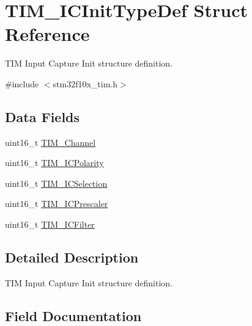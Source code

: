 \hypertarget{struct_t_i_m___i_c_init_type_def}{}\section{T\+I\+M\+\_\+\+I\+C\+Init\+Type\+Def Struct Reference}
\label{struct_t_i_m___i_c_init_type_def}


T\+IM Input Capture Init structure definition.  




{\ttfamily \#include $<$stm32f10x\+\_\+tim.\+h$>$}

\subsection*{Data Fields}
\begin{DoxyCompactItemize}
\item 
uint16\+\_\+t \mbox{\hyperlink{struct_t_i_m___i_c_init_type_def_ac736e711f51054bef8b486b8521ef611}{T\+I\+M\+\_\+\+Channel}}
\item 
uint16\+\_\+t \mbox{\hyperlink{struct_t_i_m___i_c_init_type_def_a71dc0cc2f4eb59451ea323719b0741bb}{T\+I\+M\+\_\+\+I\+C\+Polarity}}
\item 
uint16\+\_\+t \mbox{\hyperlink{struct_t_i_m___i_c_init_type_def_a052908740c8c618054ef82b3ec89e9b3}{T\+I\+M\+\_\+\+I\+C\+Selection}}
\item 
uint16\+\_\+t \mbox{\hyperlink{struct_t_i_m___i_c_init_type_def_abdff50beb0809a640ccf2cebde439a00}{T\+I\+M\+\_\+\+I\+C\+Prescaler}}
\item 
uint16\+\_\+t \mbox{\hyperlink{struct_t_i_m___i_c_init_type_def_a751574b5d1f66bea6c3405d2975e420a}{T\+I\+M\+\_\+\+I\+C\+Filter}}
\end{DoxyCompactItemize}


\subsection{Detailed Description}
T\+IM Input Capture Init structure definition. 



\subsection{Field Documentation}
\mbox{\label{struct_t_i_m___i_c_init_type_def_ac736e711f51054bef8b486b8521ef611}} 
